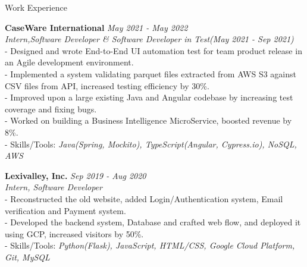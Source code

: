 \documentclass{resume} %
\begin{document}
\begin{rSection}{Work Experience}

{\bf CaseWare International} \hfill {\em May 2021 - May 2022} 
\\{\textit{Intern,Software Developer \& Software Developer in Test(May 2021 - Sep 2021)}}
\\- Designed and wrote End-to-End UI automation test for team product release in an Agile development environment.
\\- Implemented a system validating parquet files extracted from AWS S3 against CSV files from API, increased testing efficiency by 30\%.
\\- Improved upon a large existing Java and Angular codebase by increasing test coverage and fixing bugs.
\\- Worked on building a Business Intelligence MicroService, boosted revenue by 8\%.
\\- Skills/Tools: \emph{Java(Spring, Mockito), TypeScript(Angular, Cypress.io), NoSQL, AWS}

{\bf Lexivalley, Inc. } \hfill {\em Sep 2019 - Aug 2020} 
\\{\textit{Intern, Software Developer}}
\\- Reconstructed the old website, added Login/Authentication system, Email verification and Payment system.
\\- Developed the backend system, Database and crafted web flow, and deployed it using GCP, increased visitors by 50\%.
\\- Skills/Tools: \emph{Python(Flask), JavaScript, HTML/CSS, Google Cloud Platform, Git, MySQL}

\end{rSection}
\end{document}

